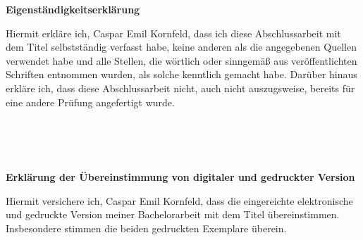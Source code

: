 \begin{center}
	\textbf{Eigenständigkeitserklärung}
\end{center}
Hiermit erkläre ich, Caspar Emil Kornfeld, dass ich diese Abschlussarbeit mit dem Titel \emph{\mytitle} selbstständig verfasst habe, keine anderen als die angegebenen Quellen verwendet habe und alle Stellen, die wörtlich oder sinngemäß aus veröffentlichten Schriften entnommen wurden, als solche kenntlich gemacht habe. Darüber hinaus erkläre ich, dass diese Abschlussarbeit nicht, auch nicht auszugsweise, bereits für eine andere Prüfung angefertigt wurde. \\
\\
\begin{flushleft}
	\makebox[.4\textwidth]{\hrulefill}\hfill \makebox[.4\textwidth]{\hrulefill}\\
	\hfill
	\\
\end{flushleft}

\vspace{3cm}

\begin{center}
	\textbf{Erklärung der Übereinstimmung von digitaler und gedruckter Version}
\end{center}
Hiermit versichere ich, Caspar Emil Kornfeld, dass die eingereichte elektronische und gedruckte Version meiner Bachelorarbeit mit dem Titel \emph{\mytitle} über\-ein\-stim\-men. Insbesondere stimmen die beiden gedruckten Exemplare überein. \\

\begin{flushleft}
	\makebox[.4\textwidth]{\hrulefill}\hfill \makebox[.4\textwidth]{\hrulefill}\\
	\hfill
	\\
\end{flushleft}
